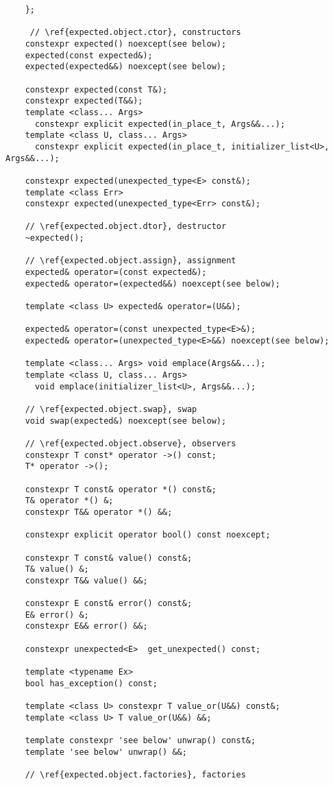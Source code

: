 \documentclass[a4paper,10pt]{article}
\begin{document}
\begin{lstlisting}
    };
    
     // \ref{expected.object.ctor}, constructors
    constexpr expected() noexcept(see below);
    expected(const expected&);
    expected(expected&&) noexcept(see below);
    
    constexpr expected(const T&);
    constexpr expected(T&&);
    template <class... Args> 
      constexpr explicit expected(in_place_t, Args&&...);     
    template <class U, class... Args>
      constexpr explicit expected(in_place_t, initializer_list<U>, Args&&...);
      
    constexpr expected(unexpected_type<E> const&);
    template <class Err> 
    constexpr expected(unexpected_type<Err> const&);

    // \ref{expected.object.dtor}, destructor
    ~expected();

    // \ref{expected.object.assign}, assignment
    expected& operator=(const expected&);
    expected& operator=(expected&&) noexcept(see below);
    
    template <class U> expected& operator=(U&&);
    
    expected& operator=(const unexpected_type<E>&);
    expected& operator=(unexpected_type<E>&&) noexcept(see below);
    
    template <class... Args> void emplace(Args&&...);
    template <class U, class... Args>
      void emplace(initializer_list<U>, Args&&...);

    // \ref{expected.object.swap}, swap
    void swap(expected&) noexcept(see below);

    // \ref{expected.object.observe}, observers
    constexpr T const* operator ->() const;
    T* operator ->();
    
    constexpr T const& operator *() const&;
    T& operator *() &;
    constexpr T&& operator *() &&;
    
    constexpr explicit operator bool() const noexcept;
    
    constexpr T const& value() const&;
    T& value() &;
    constexpr T&& value() &&;
    
    constexpr E const& error() const&;
    E& error() &;
    constexpr E&& error() &&;
    
    constexpr unexpected<E>  get_unexpected() const;
    
    template <typename Ex>
    bool has_exception() const;
      
    template <class U> constexpr T value_or(U&&) const&;
    template <class U> T value_or(U&&) &&;
    
    template constexpr 'see below' unwrap() const&;
    template 'see below' unwrap() &&;

    // \ref{expected.object.factories}, factories
\end{lstlisting}
\end{document}
